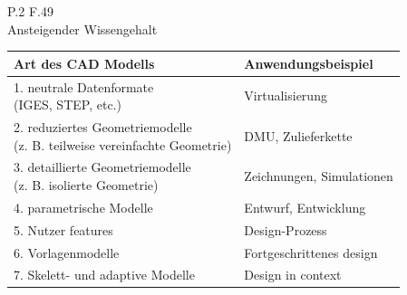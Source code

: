\documentclass[10pt,a4paper,fleqn]{article}
\begin{document}
\begin{enumerate}
		P.2 F.49\\
		Ansteigender Wissengehalt\\
		\begin{tabular}{l|l}
			Art des CAD Modells & Anwendungsbeispiel \\ 
			\hline 
			\pbox{20cm}{1. neutrale Datenformate \\ \mbox{}\hspace{0.4cm}(IGES, STEP, etc.)} & Virtualisierung \\ 
			\pbox{20cm}{2. reduziertes Geometriemodelle \\ \mbox{}\hspace{0.4cm}(z. B. teilweise vereinfachte Geometrie) } & DMU, Zulieferkette \\ 
			\pbox{20cm}{3. detaillierte Geometriemodelle \\ \mbox{}\hspace{0.4cm}(z. B. isolierte Geometrie)} & Zeichnungen, Simulationen \\ 
		 	4. parametrische Modelle & Entwurf, Entwicklung \\ 
			5. Nutzer features & Design-Prozess \\ 
			6. Vorlagenmodelle & Fortgeschrittenes design \\ 
			7. Skelett- und adaptive Modelle  & Design in context \\ 
		\end{tabular}

\end{enumerate}
\end{document}
